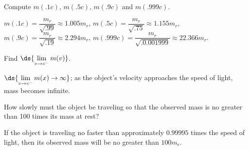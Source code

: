 \documentclass{ximera}
\begin{document}
\begin{question}
Compute $m(.1c), \, m(.5c), \, m(.9c)$ and $m(.999c)$.
\begin{solution}
$m(.1c) = \dfrac{m_{r}}{\sqrt{.99}} \approx 1.005m_{r}$,  $m(.5c) = \dfrac{m_{r}}{\sqrt{.75}} \approx 1.155m_{r}$,  $m(.9c) = \dfrac{m_{r}}{\sqrt{.19}} \approx 2.294m_{r}$, $m(.999c) = \dfrac{m_{r}}{\sqrt{.0.001999}} \approx 22.366m_{r}$.
\end{solution}

\end{question}

\begin{question}
Find $\ds{\lim_{v \rightarrow c^{-}} m(v)}$.
\begin{solution}
$\ds{\lim_{v \rightarrow c^{-}} m(x) \rightarrow \infty}$;   as the object's velocity approaches the speed of light, mass becomes infinite.
\end{solution}

\end{question}

\begin{question}
How slowly must the object be traveling so that the observed mass is no greater than 100 times its mass at rest?
\begin{solution}
If the object is traveling no faster than approximately $0.99995$ times the speed of light, then its observed mass will be no greater than $100m_{r}$.
\end{solution}

\end{question}
\end{document}
